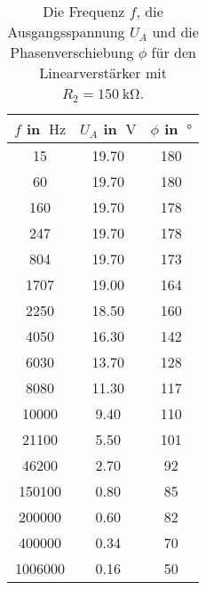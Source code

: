 \begin{table}
    \centering
    \begin{tabular}{c c c  }
        \toprule
        $f$ in $\qty{}{\hertz}$ & $U_A$ in $\qty{}{\V}$ & $\phi$ in $\qty{}{\degree} $\\
        \midrule   
        15&         19.70&     180  \\
        60&         19.70&     180  \\
        160&        19.70&     178  \\
        247&        19.70&     178  \\
        804&        19.70&     173  \\
        1707&       19.00&     164  \\
        2250&       18.50&     160  \\
        4050&       16.30&     142  \\
        6030&       13.70&     128  \\
        8080&       11.30&     117  \\
        10000&      9.40 &     110  \\
        21100&      5.50 &     101  \\
        46200&      2.70 &     92   \\
        150100&     0.80 &     85   \\
        200000&     0.60 &     82   \\
        400000&     0.34 &     70   \\
        1006000&    0.16 &     50   \\
        \bottomrule 
    \end{tabular}
    \caption{Die Frequenz $f$, die Ausgangsspannung $U_A$
     und die Phasenverschiebung $\phi$ für den Linearverstärker mit $R_2=\qty{150}{\kilo\ohm}$.}
    \label{tab:m2}
\end{table}

